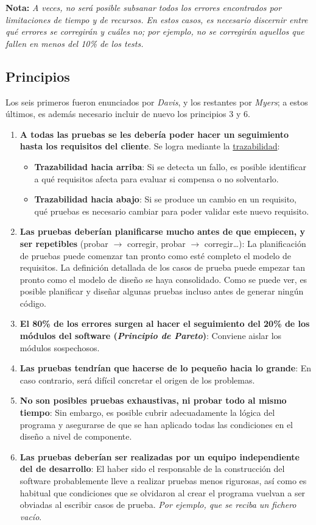 \textbf{Nota:} \textit{A veces, no será posible subsanar todos los errores encontrados por limitaciones de tiempo y de recursos. En estos casos, es necesario discernir entre qué errores se corregirán y cuáles no; por ejemplo, no se corregirán aquellos que fallen en menos del 10\% de los tests.}

\subsection{Principios}

Los seis primeros fueron enunciados por \textit{Davis}, y los restantes por \textit{Myers}; a estos últimos, es además necesario incluir de nuevo los principios 3 y 6.

\begin{enumerate}
    \item \textbf{A todas las pruebas se les debería poder hacer un seguimiento hasta los requisitos del cliente}. Se logra mediante la \uline{trazabilidad}:
    \begin{itemize}
        \item \textbf{Trazabilidad hacia arriba}: Si se detecta un fallo, es posible identificar a qué requisitos afecta para evaluar si compensa o no solventarlo.
        \item \textbf{Trazabilidad hacia abajo}: Si se produce un cambio en un requisito, qué pruebas es necesario cambiar para poder validar este nuevo requisito.
    \end{itemize}
    \item \textbf{Las pruebas deberían planificarse mucho antes de que empiecen, y ser repetibles} (probar $\rightarrow$ corregir, probar $\rightarrow$ corregir\ldots): La planificación de pruebas puede comenzar tan pronto como esté completo el modelo de requisitos. La definición detallada de los casos de prueba puede empezar tan pronto como el modelo de diseño se haya consolidado. Como se puede ver, es posible planificar y diseñar algunas pruebas incluso antes de generar ningún código.
    \item \textbf{El 80\% de los errores surgen al hacer el seguimiento del 20\% de los módulos del software (\textit{Principio de Pareto})}: Conviene aislar los módulos sospechosos.
    \item \textbf{Las pruebas tendrían que hacerse de lo pequeño hacia lo grande}: En caso contrario, será difícil concretar el origen de los problemas.
    \item \textbf{No son posibles pruebas exhaustivas, ni probar todo al mismo tiempo}: Sin embargo, es posible cubrir adecuadamente la lógica del programa y asegurarse de que se han aplicado todas las condiciones en el diseño a nivel de componente.
    \item \textbf{Las pruebas deberían ser realizadas por un equipo independiente del de desarrollo}: El haber sido el responsable de la construcción del software probablemente lleve a realizar pruebas menos rigurosas, así como es habitual que condiciones que se olvidaron al crear el programa vuelvan a ser obviadas al escribir casos de prueba. \textit{Por ejemplo, que se reciba un fichero vacío}.\\
    


\end{enumerate}
